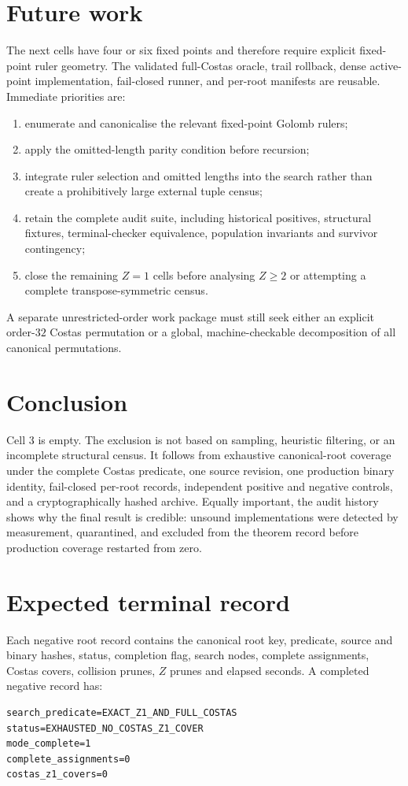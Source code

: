 \documentclass[11pt,a4paper]{article}
\theoremstyle{definition}\newtheorem{definition}[theorem]{Definition}
\theoremstyle{remark}\newtheorem{remark}[theorem]{Remark}
\begin{document}
\section{Future work}
The next cells have four or six fixed points and therefore require explicit fixed-point ruler geometry. The validated full-Costas oracle, trail rollback, dense active-point implementation, fail-closed runner, and per-root manifests are reusable. Immediate priorities are:
\begin{enumerate}
\item enumerate and canonicalise the relevant fixed-point Golomb rulers;
\item apply the omitted-length parity condition before recursion;
\item integrate ruler selection and omitted lengths into the search rather than create a prohibitively large external tuple census;
\item retain the complete audit suite, including historical positives, structural fixtures, terminal-checker equivalence, population invariants and survivor contingency;
\item close the remaining $Z=1$ cells before analysing $Z\ge2$ or attempting a complete transpose-symmetric census.
\end{enumerate}
A separate unrestricted-order work package must still seek either an explicit order-$32$ Costas permutation or a global, machine-checkable decomposition of all canonical permutations.

\section{Conclusion}
Cell 3 is empty. The exclusion is not based on sampling, heuristic filtering, or an incomplete structural census. It follows from exhaustive canonical-root coverage under the complete Costas predicate, one source revision, one production binary identity, fail-closed per-root records, independent positive and negative controls, and a cryptographically hashed archive. Equally important, the audit history shows why the final result is credible: unsound implementations were detected by measurement, quarantined, and excluded from the theorem record before production coverage restarted from zero.

\appendix
\section{Expected terminal record}
Each negative root record contains the canonical root key, predicate, source and binary hashes, status, completion flag, search nodes, complete assignments, Costas covers, collision prunes, $Z$ prunes and elapsed seconds. A completed negative record has:
\begin{verbatim}
search_predicate=EXACT_Z1_AND_FULL_COSTAS
status=EXHAUSTED_NO_COSTAS_Z1_COVER
mode_complete=1
complete_assignments=0
costas_z1_covers=0
\end{verbatim}
\end{document}
